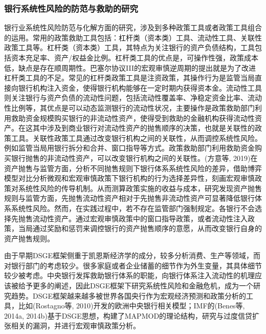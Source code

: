 \subsubsection{银行系统性风险的防范与救助的研究}

银行业系统性风险防范与化解方面的研究，涉及到多种政策工具或者政策工具组合的运用。常用的政策救助工具包括：杠杆类（资本类）工具、流动性工具、关联性政策工具等。杠杆类（资本类）工具，其特点为关注银行的资产负债结构，工具包括资本充足率、资产/权益金比例。杠杆类工具的优点是，可操作性强，政策成本低，缺点是存在顺周期性。巴塞尔协议III的宏观审慎逆周期的提出就是为了改进杠杆类工具的不足。常见的杠杆类政策工具是注资政策，其操作行为是监管当局直接向银行机构注入资金，使得银行机构能够在一定时期内获得资本金。流动性工具则关注银行与资产负债的流动性问题，包括流动性覆盖率、净稳定资金比率、流动性比例等，其优点是可以动态监测银行的流动性状况，主要操作是政策救助部门利用救助资金规模购买银行的非流动性资产，使得受到救助的金融机构获得流动性资产。在这其中涉及到商业银行对流动性资产的抛售顺序的决策，也就是关联性的政策工具。关联性政策工具通过改变银行机构之间的关联性，从而调控系统性风险。例如监管当局用银行拆分和合并、窗口指导等方式。政策救助部门利用救助资金购买银行抛售的非流动性资产，可以改变银行机构之间的关联性。(方意等, 2019)在资产抛售与监管方面，分析不同抛售规则下银行体系系统性风险的差异，借助博弈模型对比分析微观和宏观审慎政策下银行机构的行为选择差异性，刻画宏观审慎政策对系统性风险的传导机制。从而测算政策实施的收益与成本，研究发现资产抛售规则与监管方面，先抛售流动性资产相对于先抛售非流动性资产可显著降低银行体系系统性风险。然而，在实践过程中，若不存在监管部门强制规定。各银行不会选择先抛售流动性资产。通过宏观审慎政策中的窗口指导政策，或者流动性注入政策，当局通过奖励和惩罚来调控银行的资产抛售顺序的意愿，从而改变银行自身的资产抛售规则。

由于早期DSGE框架侧重于凯恩斯经济学的成分，较多分析消费、生产等领域，而对银行部门的考虑较少。很多家庭或者企业储蓄的细节作为外生变量，其具体细节较少被考虑。中央银行发挥救助银行体系的职能，向银行体系注入流动性的机理应该被给予更多的阐述，因此DSGE框架下研究系统性风险和金融危机，成为一个研究趋势。DSGE框架越来越多被世界各国央行作为宏观经济预测和政策分析的工具，比如(Rostagno等, 2010)开发的欧洲中央银行相关模型；IMF的(Benes等, 2014a, 2014b)基于DSGE思想，构建了MAPMOD的理论结构，研究与过度信贷扩张相关的漏洞，并进行宏观审慎政策分析。

